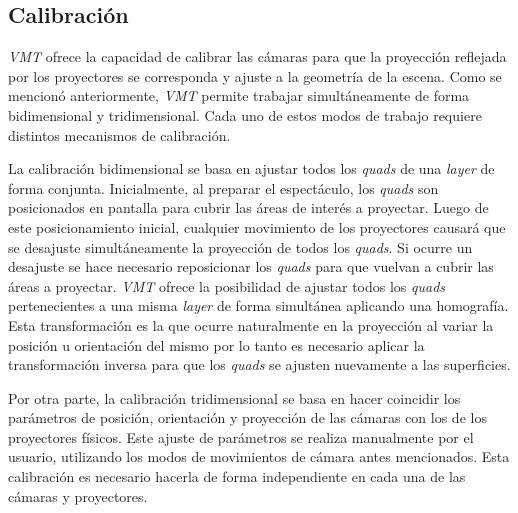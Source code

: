 
\subsection{Calibración}

\emph{VMT} ofrece la capacidad de calibrar las cámaras para que la proyección reflejada por los proyectores se corresponda y ajuste a la geometría de la escena.
Como se mencionó anteriormente, \emph{VMT} permite trabajar simultáneamente de forma bidimensional y tridimensional. Cada uno de estos modos de trabajo requiere distintos mecanismos de calibración.

La calibración bidimensional se basa en ajustar todos los \emph{quads} de una \emph{layer} de forma conjunta.
Inicialmente, al preparar el espectáculo, los \emph{quads} son posicionados en pantalla para cubrir las áreas de interés a proyectar. Luego de este posicionamiento inicial, cualquier movimiento de los proyectores causará que se desajuste simultáneamente la proyección de todos los \emph{quads}. Si ocurre un desajuste se hace necesario reposicionar los \emph{quads} para que vuelvan a cubrir las áreas a proyectar.
\emph{VMT} ofrece la posibilidad de ajustar todos los \emph{quads} pertenecientes a una misma \emph{layer} de forma simultánea aplicando una homografía. Esta transformación es la que ocurre naturalmente en la proyección al variar la posición u orientación del mismo por lo tanto es necesario aplicar la transformación inversa para que los \emph{quads} se ajusten nuevamente a las superficies.

Por otra parte, la calibración tridimensional se basa en hacer coincidir los parámetros de posición, orientación y proyección de las cámaras con los de los proyectores físicos. Este ajuste de parámetros se realiza manualmente por el usuario, utilizando los modos de movimientos de cámara antes mencionados. Esta calibración es necesario hacerla de forma independiente en cada una de las cámaras y proyectores.

